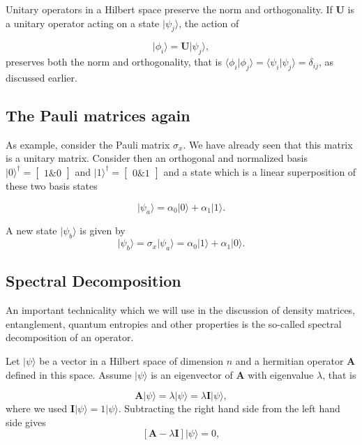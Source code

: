 \noindent
Unitary operators in a Hilbert space preserve the norm and orthogonality. If $\bm{U}$ is a unitary operator acting on a state $\vert \psi_j\rangle$, the action of

\[
\vert \phi_i\rangle=\bm{U}\vert \psi_j\rangle,
\]
preserves both the norm and orthogonality, that is $\langle \phi_i \vert \phi_j\rangle=\langle \psi_i \vert \psi_j\rangle=\delta_{ij}$, as discussed earlier.

\subsection{The Pauli matrices again}

As example, consider the Pauli matrix $\sigma_x$. We have already seen that this matrix is a unitary matrix. Consider then an orthogonal and normalized basis $\vert 0\rangle^{\dagger} =\begin{bmatrix} 1 {\&} 0\end{bmatrix}$ and $\vert 1\rangle^{\dagger} =\begin{bmatrix} 0 {\&} 1\end{bmatrix}$ and a state which is a linear superposition of these two basis states

\[
\vert \psi_a\rangle=\alpha_0\vert 0\rangle +\alpha_1\vert 1\rangle.
\]

A new state $\vert \psi_b\rangle$ is given by
\[
\vert \psi_b\rangle=\sigma_x\vert \psi_a\rangle=\alpha_0\vert 1\rangle +\alpha_1\vert 0\rangle.
\]

\subsection{Spectral Decomposition}

An important technicality which we will use in the discussion of
density matrices, entanglement, quantum entropies and other properties
is the so-called spectral decomposition of an operator.

Let $\vert \psi\rangle$ be a vector in a Hilbert space of dimension $n$ and a hermitian operator $\bm{A}$ defined in this
space. Assume $\vert \psi\rangle$ is an eigenvector of $\bm{A}$ with eigenvalue $\lambda$, that is

\[
\bm{A}\vert \psi\rangle = \lambda\vert \psi\rangle = \lambda \bm{I}\vert \psi \rangle,
\]
where we used $\bm{I}\vert \psi \rangle = 1 \vert \psi \rangle$.
Subtracting the right hand side from the left hand side gives
\[
\left[\bm{A}-\lambda \bm{I}\right]\vert \psi \rangle=0,
\]

